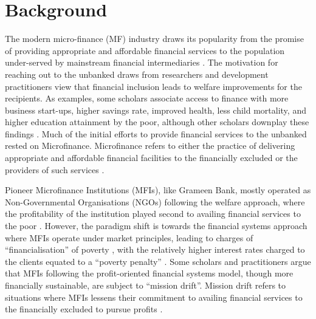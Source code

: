 \documentclass[a4paper,nobind]{templates/ociamthesis}
\begin{document}
\newpage

\hypertarget{background}{%
\section{\texorpdfstring{\textbf{Background}}{Background}}\label{background}}

The modern micro-finance (MF) industry draws its popularity from the promise of providing appropriate and affordable financial services to the population under-served by mainstream financial intermediaries \autocite{morduch1999microfinance,morduch2000microfinance}. The motivation for reaching out to the unbanked draws from researchers and development practitioners view that financial inclusion leads to welfare improvements for the recipients. As examples, some scholars associate access to finance with more business start-ups, higher savings rate, improved health, less child mortality, and higher education attainment by the poor, although other scholars downplay these findings \autocite{klapper2015role,o2017systematic,shahriar2017lender}. Much of the initial efforts to provide financial services to the unbanked rested on Microfinance. Microfinance refers to either the practice of delivering appropriate and affordable financial facilities to the financially excluded or the providers of such services \autocite{ledgerwood2006transforming}.

Pioneer Microfinance Institutions (MFIs), like Grameen Bank, mostly operated as Non-Governmental Organisations (NGOs) following the welfare approach, where the profitability of the institution played second to availing financial services to the poor \autocite{chahine2010social,d2017ngos}. However, the paradigm shift is towards the financial systems approach where MFIs operate under market principles, leading to charges of ``financialisation'' of poverty \autocite{mader2015financialization}, with the relatively higher interest rates charged to the clients equated to a ``poverty penalty'' \autocite{chen2017microfinance}. Some scholars and practitioners argue that MFIs following the profit-oriented financial systems model, though more financially sustainable, are subject to ``mission drift''. Mission drift refers to situations where MFIs lessens their commitment to availing financial services to the financially excluded to pursue profits \autocite{jia2016commercialization,mia2017mission}.
\end{document}
